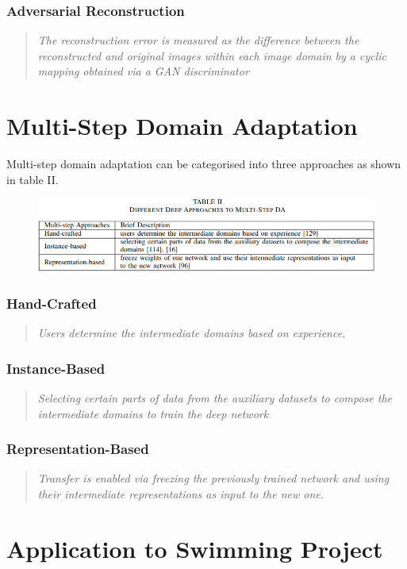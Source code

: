 \documentclass{report}
\newcommand{\quoteit}[1]{\begin{quote}\textit{#1}\end{quote}}
\begin{document}
\subsection{Adversarial Reconstruction}
\quoteit{The reconstruction error is measured as the difference between the reconstructed and original images within each image domain by a cyclic mapping obtained via a GAN discriminator}





\setcounter{chapter}{2}
\chapter*{Multi-Step Domain Adaptation}
Multi-step domain adaptation can be categorised into three approaches as shown in table II.
\begin{figure}[!h]
	\centering
	\includegraphics[width=14cm]{two-step-approaches}
	\label{fig:two-step-approaches:1}
\end{figure}
\subsection{Hand-Crafted}
\quoteit{Users determine the intermediate domains based on experience.}
\subsection{Instance-Based}
\quoteit{Selecting certain parts of data from the auxiliary datasets to compose the intermediate domains to train the deep network}
\subsection{Representation-Based}
\quoteit{Transfer is enabled via freezing the previously trained network and using their intermediate representations as input to the new one.}


\chapter*{Application to Swimming Project}

	
\end{document}
